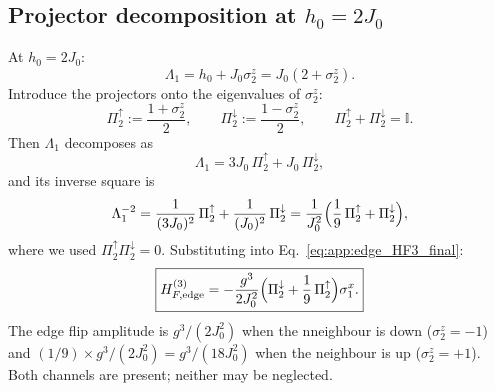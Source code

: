 \documentclass[aps,prb,reprint,twocolumn,amsmath,amssymb,citeautoscript]{revtex4-2}
\begin{document}

\subsection{Projector decomposition at $h_0=2J_0$}
\label{app:edge:projector}

At $h_0=2J_0$:
\begin{equation}
\Lambda_1=h_0+J_0\sigma_2^z
=J_0(2+\sigma_2^z).
\label{eq:app:edge_Lambda_2J}
\end{equation}
Introduce the projectors onto the eigenvalues of $\sigma_2^z$:
\begin{equation}
\Pi_2^{\uparrow}:=\frac{1+\sigma_2^z}{2},
\qquad
\Pi_2^{\downarrow}:=\frac{1-\sigma_2^z}{2},
\qquad
\Pi_2^{\uparrow}+\Pi_2^{\downarrow}=\mathbb{I}.
\label{eq:app:edge_projectors}
\end{equation}
Then $\Lambda_1$ decomposes as
\begin{equation}
\Lambda_1=3J_0\,\Pi_2^{\uparrow}+J_0\,\Pi_2^{\downarrow},
\label{eq:app:edge_Lambda_proj}
\end{equation}
and its inverse square is
\begin{equation}
\Lambda_1^{-2}
=\frac{1}{(3J_0)^2}\,\Pi_2^{\uparrow}
+\frac{1}{(J_0)^2}\,\Pi_2^{\downarrow}
=\frac{1}{J_0^2}\Bigl(\frac{1}{9}\,\Pi_2^{\uparrow}
+\Pi_2^{\downarrow}\Bigr),
\label{eq:app:edge_Lambda_inv}
\end{equation}
where we used $\Pi_2^{\uparrow}\Pi_2^{\downarrow}=0$.
Substituting into Eq.~\eqref{eq:app:edge_HF3_final}:
\begin{equation}
\boxed{%
H_{F,\mathrm{edge}}^{(3)}
=-\frac{g^3}{2J_0^2}
\Bigl(\Pi_2^{\downarrow}
+\frac{1}{9}\,\Pi_2^{\uparrow}\Bigr)\sigma_1^x.}
\label{eq:app:edge_HF3_proj}
\end{equation}
The edge flip amplitude is $g^3/(2J_0^2)$ when the
nneighbour is down ($\sigma_2^z=-1$) and $(1/9)\times g^3/(2J_0^2)
=g^3/(18J_0^2)$ when the neighbour is up ($\sigma_2^z=+1$).
Both channels are present; neither may be neglected.
\end{document}
